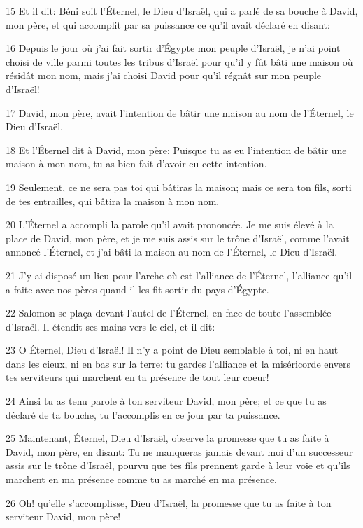 \par 15 Et il dit: Béni soit l'Éternel, le Dieu d'Israël, qui a parlé de sa bouche à David, mon père, et qui accomplit par sa puissance ce qu'il avait déclaré en disant:
\par 16 Depuis le jour où j'ai fait sortir d'Égypte mon peuple d'Israël, je n'ai point choisi de ville parmi toutes les tribus d'Israël pour qu'il y fût bâti une maison où résidât mon nom, mais j'ai choisi David pour qu'il régnât sur mon peuple d'Israël!
\par 17 David, mon père, avait l'intention de bâtir une maison au nom de l'Éternel, le Dieu d'Israël.
\par 18 Et l'Éternel dit à David, mon père: Puisque tu as eu l'intention de bâtir une maison à mon nom, tu as bien fait d'avoir eu cette intention.
\par 19 Seulement, ce ne sera pas toi qui bâtiras la maison; mais ce sera ton fils, sorti de tes entrailles, qui bâtira la maison à mon nom.
\par 20 L'Éternel a accompli la parole qu'il avait prononcée. Je me suis élevé à la place de David, mon père, et je me suis assis sur le trône d'Israël, comme l'avait annoncé l'Éternel, et j'ai bâti la maison au nom de l'Éternel, le Dieu d'Israël.
\par 21 J'y ai disposé un lieu pour l'arche où est l'alliance de l'Éternel, l'alliance qu'il a faite avec nos pères quand il les fit sortir du pays d'Égypte.
\par 22 Salomon se plaça devant l'autel de l'Éternel, en face de toute l'assemblée d'Israël. Il étendit ses mains vers le ciel, et il dit:
\par 23 O Éternel, Dieu d'Israël! Il n'y a point de Dieu semblable à toi, ni en haut dans les cieux, ni en bas sur la terre: tu gardes l'alliance et la miséricorde envers tes serviteurs qui marchent en ta présence de tout leur coeur!
\par 24 Ainsi tu as tenu parole à ton serviteur David, mon père; et ce que tu as déclaré de ta bouche, tu l'accomplis en ce jour par ta puissance.
\par 25 Maintenant, Éternel, Dieu d'Israël, observe la promesse que tu as faite à David, mon père, en disant: Tu ne manqueras jamais devant moi d'un successeur assis sur le trône d'Israël, pourvu que tes fils prennent garde à leur voie et qu'ils marchent en ma présence comme tu as marché en ma présence.
\par 26 Oh! qu'elle s'accomplisse, Dieu d'Israël, la promesse que tu as faite à ton serviteur David, mon père!

